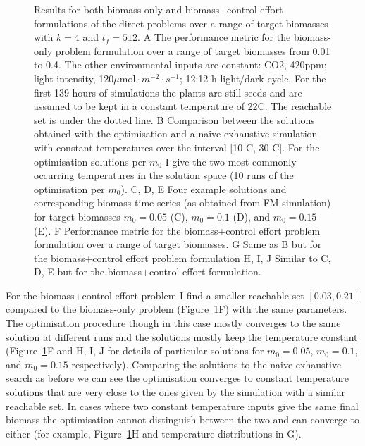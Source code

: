 \begin{figure}[p]
  \centering {}
  \caption{ Results for both biomass-only and biomass+control effort
    formulations of the direct problems over a range of target biomasses with
    $k=4$ and $t_f=512$. A The performance metric for the biomass-only problem
    formulation over a range of target biomasses from 0.01 to 0.4. The other
    environmental inputs are constant: CO2, 420ppm; light intensity,
    120$\mu\mathrm{mol} \cdot m^{-2} \cdot s^{-1}$; 12:12-h light/dark
    cycle. For the first 139 hours of simulations the plants are still seeds and
    are assumed to be kept in a constant temperature of 22\textdegree C. The
    reachable set is under the dotted line. B Comparison between the solutions
    obtained with the optimisation and a naive exhaustive simulation with
    constant temperatures over the interval [10 \textdegree C, 30 \textdegree
    C]. For the optimisation solutions per $m_0$ I give the two most commonly
    occurring temperatures in the solution space (10 runs of the optimisation
    per $m_0$). C, D, E Four example solutions and corresponding biomass time
    series (as obtained from FM simulation) for target biomasses $m_0=0.05$ (C),
    $m_0=0.1$ (D), and $m_0=0.15$ (E). F Performance metric for the
    biomass+control effort problem formulation over a range of target
    biomasses. G Same as B but for the biomass+control effort problem
    formulation H, I, J Similar to C, D, E but for the biomass+control effort
    formulation.}
\label{fig:directPRes}
\end{figure}

For the biomass+control effort problem I find a smaller reachable set
$[0.03, 0.21]$ compared to the biomass-only problem
(Figure~\ref{fig:directPRes}F) with the same parameters. The optimisation
procedure though in this case mostly converges to the same solution at different
runs and the solutions mostly keep the temperature constant
(Figure~\ref{fig:directPRes}F and H, I, J for details of particular solutions
for $m_0=0.05$, $m_0=0.1$, and $m_0=0.15$ respectively). Comparing the solutions
to the naive exhaustive search as before we can see the optimisation converges
to constant temperature solutions that are very close to the ones given by the
simulation with a similar reachable set. In cases where two constant temperature
inputs give the same final biomass the optimisation cannot distinguish between
the two and can converge to either (for example, Figure~\ref{fig:directPRes}H
and temperature distributions in G).

